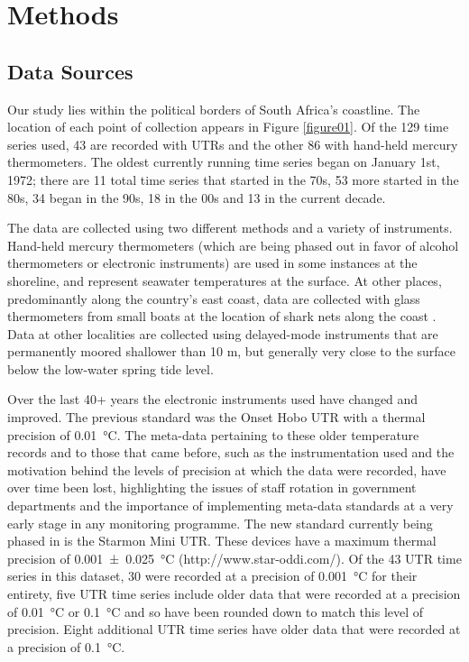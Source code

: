 \documentclass[]{ametsoc}
\begin{document}
\section{Methods}

\subsection{Data Sources}
Our study lies within the political borders of South Africa's coastline. The location of each point of collection appears in Figure \ref{figure01}. Of the 129 time series used, 43 are recorded with UTRs and the other 86 with hand-held mercury thermometers. The oldest currently running time series began on January 1st, 1972; there are 11 total time series that started in the 70s, 53 more started in the 80s, 34 began in the 90s, 18 in the 00s and 13 in the current decade.

The data are collected using two different methods and a variety of instruments. Hand-held mercury thermometers (which are being phased out in favor of alcohol thermometers or electronic instruments) are used in some instances at the shoreline, and represent seawater temperatures at the surface. At other places, predominantly along the country's east coast, data are collected with glass thermometers from small boats at the location of shark nets along the coast \citep{Cliff1988}. Data at other localities are collected using delayed-mode instruments that are permanently moored shallower than 10 m, but generally very close to the surface below the low-water spring tide level.

Over the last 40+ years the electronic instruments used have changed and improved. The previous standard was the Onset Hobo UTR with a thermal precision of \SI{0.01}{\degreeCelsius}. The meta-data pertaining to these older temperature records and to those that came before, such as the instrumentation used and the motivation behind the levels of precision at which the data were recorded, have over time been lost, highlighting the issues of staff rotation in government departments and the importance of implementing meta-data standards at a very early stage in any monitoring programme. The new standard currently being phased in is the Starmon Mini UTR. These devices have a maximum thermal precision of \SI[separate-uncertainty = true, multi-part-units = repeat]{0.001(25)}{\degreeCelsius} (http://www.star-oddi.com/). Of the 43 UTR time series in this dataset, 30 were recorded at a precision of \SI{0.001}{\degreeCelsius} for their entirety, five UTR time series include older data that were recorded at a precision of \SI{0.01}{\degreeCelsius} or \SI{0.1}{\degreeCelsius} and so have been rounded down to match this level of precision. Eight additional UTR time series have older data that were recorded at a precision of \SI{0.1}{\degreeCelsius}.
\end{document}
